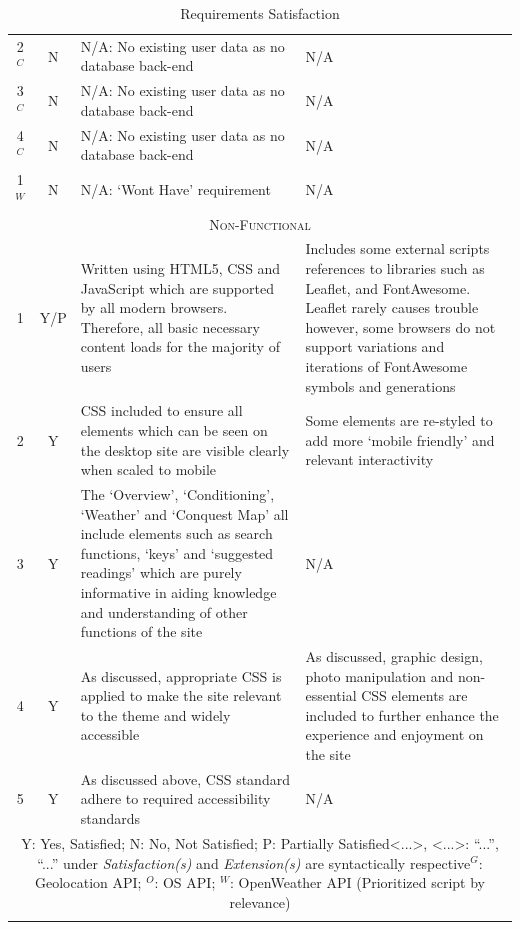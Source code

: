 \documentclass[11pt, english]{article}
\begin{document}
\begin{center}
\begin{longtable}{ccp{5.5cm}p{5.5cm}}
		2$^C$ & N & N/A: No existing user data as no database back-end & N/A\\
		3$^C$ & N & N/A: No existing user data as no database back-end & N/A\\
		4$^C$ & N & N/A: No existing user data as no database back-end & N/A\\
		1$^W$ & N & N/A: `Wont Have' requirement & N/A\\
		\hline
		\multicolumn{4}{c}{\textsc{Non-Functional}}\\
		\hline
		1 & Y/P & Written using HTML5, CSS and JavaScript which are supported by all modern browsers. Therefore, all basic necessary content loads for the majority of users & Includes some external scripts references to libraries such as Leaflet, and FontAwesome. Leaflet rarely causes trouble however, some browsers do not support variations and iterations of FontAwesome symbols and generations\\
		2 & Y & CSS included to ensure all elements which can be seen on the desktop site are visible clearly when scaled to mobile & Some elements are re-styled to add more `mobile friendly' and relevant interactivity\\
		3 & Y & The `Overview', `Conditioning', `Weather' and `Conquest Map' all include elements such as search functions, `keys' and `suggested readings' which are purely informative in aiding knowledge and understanding of other functions of the site & N/A\\
		4 & Y & As discussed, appropriate CSS is applied to make the site relevant to the theme and widely accessible & As discussed, graphic design, photo manipulation and non-essential CSS elements are included to further enhance the experience and enjoyment on the site\\
		5 & Y & As discussed above, CSS standard adhere to required accessibility standards & N/A\\
		\hline
		\multicolumn{4}{p{12cm}}{Y: Yes, Satisfied; N: No, Not Satisfied; P: Partially Satisfied\newline <...>, <...>: ``...'', ``...'' under \textit{Satisfaction(s)} and \textit{Extension(s)} are syntactically respective\newline $^G$: Geolocation API; $^O$: OS API; $^W$: OpenWeather API (Prioritized script by relevance)}\\
		\hline
		\caption{Requirements Satisfaction}
	\end{longtable}
	\end{center}
\end{document}
